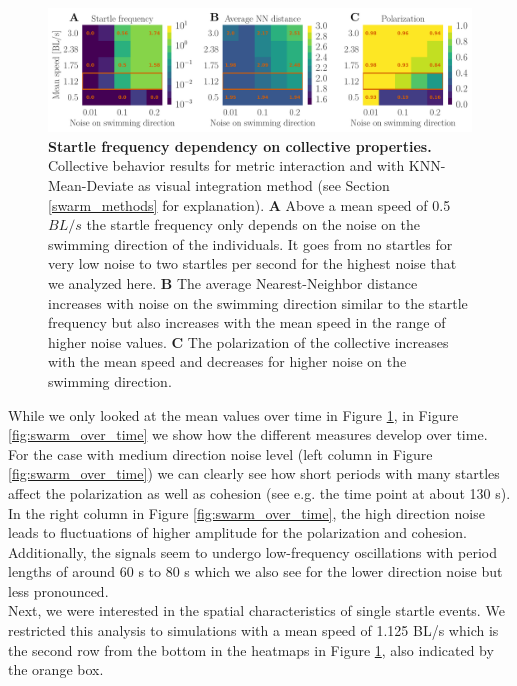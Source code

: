 \documentclass[a4paper,10pt,hidelinks]{scrreprt}
\begin{document}
    \begin{figure}[H]
    \begin{center}
    \includegraphics[width=\textwidth]{looming_swarm_fixed_rhonull_int_type_matrix_vis_method_knn_mean_deviate_new.pdf}
    \end{center}
    \caption{\textbf{Startle frequency dependency on collective properties.} Collective behavior results for metric interaction and with KNN-Mean-Deviate as visual integration method (see Section \ref{swarm_methods} for explanation). \textbf{A} Above a mean speed of 0.5 $BL/s$ the startle frequency only depends on the noise on the swimming direction of the individuals. It goes from no startles for very low noise to two startles per second for the highest noise that we analyzed here. \textbf{B} The average Nearest-Neighbor distance increases with noise on the swimming direction similar to the startle frequency but also increases with the mean speed in the range of higher noise values. \textbf{C} The polarization of the collective increases with the mean speed and decreases for higher noise on the swimming direction.}
    \label{fig:swarm_heatmaps}
    \end{figure}
    While we only looked at the mean values over time in Figure \ref{fig:swarm_heatmaps}, in Figure \ref{fig:swarm_over_time} we show how the different measures develop over time.
    For the case with medium direction noise level (left column in Figure \ref{fig:swarm_over_time}) we can clearly see how short periods with many startles affect the polarization as well as cohesion (see e.g. the time point at about 130 s).
    In the right column in Figure \ref{fig:swarm_over_time}, the high direction noise leads to fluctuations of higher amplitude for the polarization and cohesion.
    Additionally, the signals seem to undergo low-frequency oscillations with period lengths of around 60 s to 80 s which we also see for the lower direction noise but less pronounced.\\
    Next, we were interested in the spatial characteristics of single startle events.
    We restricted this analysis to simulations with a mean speed of 1.125 BL/s which is the second row from the bottom in the heatmaps in Figure \ref{fig:swarm_heatmaps}, also indicated by the orange box.
\end{document}
